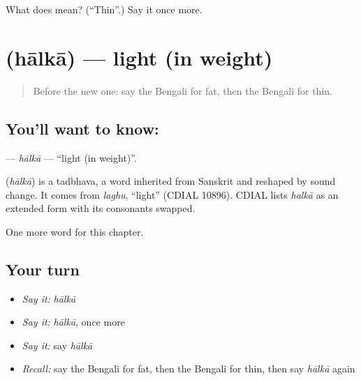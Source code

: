 \begin{tcolorbox}[breakable,colback=teal!4,colframe=teal!35!black,title={Before you move on}]
What does  mean? (\textquotedblleft{}Thin\textquotedblright{}.) Say it once more.
\end{tcolorbox}
\section[\texorpdfstring{\bn{হালকা} (hālkā)}{হালকা (hālkā)}]{ (hālkā) — light (in weight)}

\label{lesson:BN-C76-halka}



\begin{quote}
Before the new one: say the Bengali for fat, then the Bengali for thin.
\end{quote}

\subsection*{You'll want to know: }
\textbf{} — \emph{hālkā} — \textquotedblleft{}light (in weight)\textquotedblright{}.

\begin{cousinweb}
\textbf{} (\emph{hālkā}) is a tadbhava, a word inherited from Sanskrit and reshaped by sound change. It comes from \emph{laghu}, \textquotedblleft{}light\textquotedblright{} (CDIAL 10896). CDIAL lists \emph{halkā} as an extended form with its consonants swapped.
\end{cousinweb}

\begin{grammarlens}[title={What you've built}]
One more word for this chapter.
\end{grammarlens}

\subsection*{Your turn}
\begin{itemize}
\raggedright
  \item \emph{Say it:} \emph{hālkā}
  \item \emph{Say it:} \emph{hālkā}, once more
  \item \emph{Say it:} say \emph{hālkā}
  \item \emph{Recall:} say the Bengali for fat, then the Bengali for thin, then say \emph{hālkā} again
\end{itemize}

